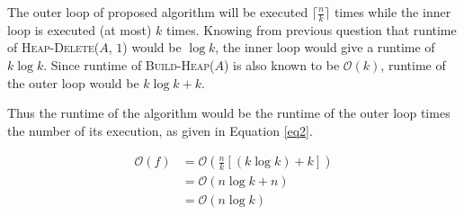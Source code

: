 The outer loop of proposed algorithm will be executed $\lceil \frac{n}{k} \rceil$ times while the inner loop is executed (at most) $k$ times. Knowing from previous question that runtime of \textsc{Heap-Delete}($A$, $1$) would be $\log{k}$, the inner loop would give a runtime of $k\log{k}$. Since runtime of \textsc{Build-Heap}($A$) is also known to be $\mathcal{O}(k)$, runtime of the outer loop would be $k \log k + k$.

Thus the runtime of the algorithm would be the runtime of the outer loop times the number of its execution, as given in Equation \ref{eq2}.

\begin{equation}\label{eq2}
\begin{aligned}
\mathcal{O}(f) &=
\mathcal{O}(\frac{n}{k}[(k\log k)+ k])\\ &= \mathcal{O}(n \log k + n)\\ &= \mathcal{O}(n\log k)
\end{aligned}
\end{equation}

